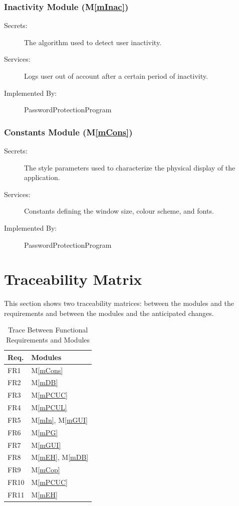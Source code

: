 \documentclass[12pt, titlepage]{article}
\newcommand{\mref}[1]{M\ref{#1}}
\begin{document}
\subsubsection{Inactivity Module (\mref{mInac})}

\begin{description}
\item[Secrets:] The algorithm used to detect user inactivity.
\item[Services:] Logs user out of account after a certain period of inactivity.
\item[Implemented By:] PasswordProtectionProgram
\end{description}

\subsubsection{Constants Module (\mref{mCons})}

\begin{description}
\item[Secrets:] The style parameters used to characterize the physical display of the application.
\item[Services:] Constants defining the window size, colour scheme, and fonts.
\item[Implemented By:] PasswordProtectionProgram
\end{description}

\section{Traceability Matrix} \label{SecTM}

This section shows two traceability matrices: between the modules and the
requirements and between the modules and the anticipated changes.

\begin{table}[H]
\centering
\begin{tabular}{p{} p{}}
\toprule
\textbf{Req.} & \textbf{Modules}\\
\midrule
FR1 & \mref{mCons}\\
FR2 & \mref{mDB}\\
FR3 & \mref{mPCUC}\\
FR4 & \mref{mPCUL}\\
FR5 & \mref{mIn}, \mref{mGUI}\\
FR6 & \mref{mPG}\\
FR7 & \mref{mGUI}\\
FR8 & \mref{mEH}, \mref{mDB}\\
FR9 & \mref{mCop}\\
FR10 & \mref{mPCUC}\\
FR11 & \mref{mEH}\\
\bottomrule
\end{tabular}
\caption{Trace Between Functional Requirements and Modules}
\label{TblRT}
\end{table}
\end{document}
